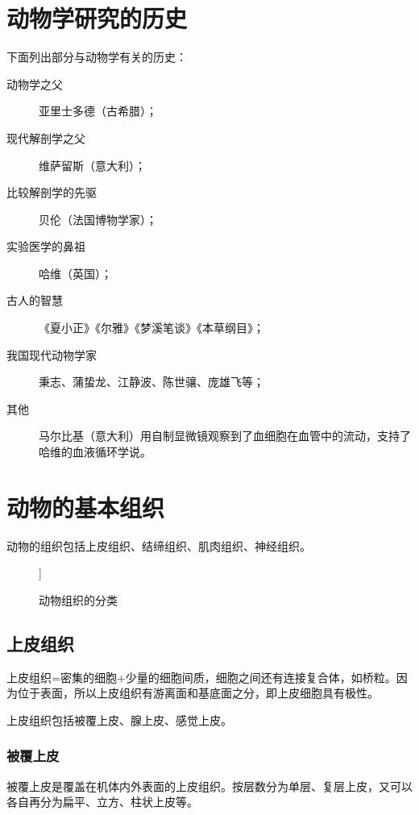 
\section{动物学研究的历史}

下面列出部分与动物学有关的历史：

\begin{description}
	\item[动物学之父] 亚里士多德（古希腊）；
	\item[现代解剖学之父] 维萨留斯（意大利）；
	\item[比较解剖学的先驱] 贝伦（法国博物学家）；
	\item[实验医学的鼻祖] 哈维（英国）；
	\item[古人的智慧]《夏小正》《尔雅》《梦溪笔谈》《本草纲目》；
	\item[我国现代动物学家] 秉志、蒲蛰龙、江静波、陈世骧、庞雄飞等；
	\item[其他] 马尔比基（意大利）用自制显微镜观察到了血细胞在血管中的流动，支持了哈维的血液循环学说。
\end{description}

\section{动物的基本组织}

动物的组织包括上皮组织、结缔组织、肌肉组织、神经组织。
\begin{figure}[h!]
	\centering
	\begin{forest}
		[动物组织
			[上皮组织]
			[结缔组织]
			[肌肉组织]
			[神经组织]]
	\end{forest}
	\caption{动物组织的分类}
	\label{fig:动物组织的分类}
\end{figure}

\subsection{上皮组织}

上皮组织=密集的细胞+少量的细胞间质，细胞之间还有连接复合体，如桥粒。因为位于表面，所以上皮组织有游离面和基底面之分，即上皮细胞具有极性。

上皮组织包括被覆上皮、腺上皮、感觉上皮。

\subsubsection{被覆上皮}

被覆上皮是覆盖在机体内外表面的上皮组织。按层数分为单层、复层上皮，又可以各自再分为扁平、立方、柱状上皮等。

